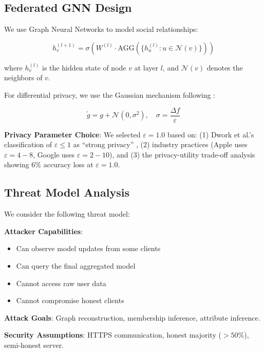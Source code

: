 \documentclass[preprint,12pt]{elsarticle}
\begin{document}
\subsection{Federated GNN Design}

We use Graph Neural Networks to model social relationships:

\begin{equation}
h_v^{(l+1)} = \sigma\left(W^{(l)} \cdot \text{AGG}\left(\{h_u^{(l)}: u \in \mathcal{N}(v)\}\right)\right)
\end{equation}

where $h_v^{(l)}$ is the hidden state of node $v$ at layer $l$, and
$\mathcal{N}(v)$ denotes the neighbors of $v$.

For differential privacy, we use the Gaussian mechanism following \citet{abadi2016deep}:

\begin{equation}
\tilde{g} = g + \mathcal{N}\left(0, \sigma^2\right), \quad \sigma = \frac{\Delta f}{\varepsilon}
\end{equation}

\textbf{Privacy Parameter Choice}: We selected $\varepsilon=1.0$ based on:
(1) Dwork et al.'s classification of $\varepsilon \leq 1$ as ``strong privacy'' \citep{dwork2014algorithmic},
(2) industry practices (Apple uses $\varepsilon=4-8$, Google uses $\varepsilon=2-10$), and
(3) the privacy-utility trade-off analysis showing 6\% accuracy loss at $\varepsilon=1.0$.

\subsection{Threat Model Analysis}

We consider the following threat model:

\textbf{Attacker Capabilities}:
\begin{itemize}
    \item Can observe model updates from some clients
    \item Can query the final aggregated model
    \item Cannot access raw user data
    \item Cannot compromise honest clients
\end{itemize}

\textbf{Attack Goals}: Graph reconstruction, membership inference, attribute inference.

\textbf{Security Assumptions}: HTTPS communication, honest majority ($>50\%$), semi-honest server.
\end{document}
